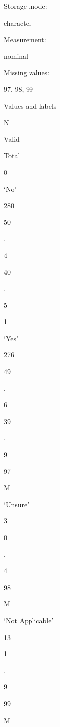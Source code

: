 \documentclass[
  letterpaper,
]{scrbook}
\begin{document}
\begin{enumerate}
\begin{enumerate}
\begin{enumerate}
\begin{enumerate}
\begin{enumerate}
\begin{enumerate}
\begin{enumerate}
              Storage mode:

              character

              Measurement:

              nominal

              Missing values:

              97, 98, 99

              Values and labels

              N

              Valid

              Total

              0

              `No'

              280

              50

              .

              4

              40

              .

              5

              1

              `Yes'

              276

              49

              .

              6

              39

              .

              9

              97

              M

              `Unsure'

              3

              0

              .

              4

              98

              M

              `Not Applicable'

              13

              1

              .

              9

              99

              M


\end{enumerate}
\end{enumerate}
\end{enumerate}
\end{enumerate}
\end{enumerate}
\end{enumerate}
\end{enumerate}
\end{document}
